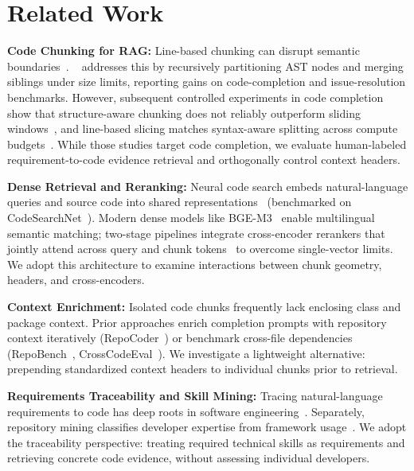 \section{Related Work}
\label{sec:related_work}

\textbf{Code Chunking for RAG:} Line-based chunking can disrupt semantic boundaries~\cite{zhang2025cast}. \castname~\cite{zhang2025cast} addresses this by recursively partitioning AST nodes and merging siblings under size limits, reporting gains on code-completion and issue-resolution benchmarks. However, subsequent controlled experiments in code completion show that structure-aware chunking does not reliably outperform sliding windows~\cite{wu2026chunking}, and line-based slicing matches syntax-aware splitting across compute budgets~\cite{galimzyanov2025practical}. While those studies target code completion, we evaluate human-labeled requirement-to-code evidence retrieval and orthogonally control context headers.

\textbf{Dense Retrieval and Reranking:} Neural code search embeds natural-language queries and source code into shared representations~\cite{feng2020codebert,guo2022unixcoder} (benchmarked on CodeSearchNet~\cite{husain2019codesearchnet}). Modern dense models like BGE-M3~\cite{chen2024bgem3} enable multilingual semantic matching; two-stage pipelines integrate cross-encoder rerankers that jointly attend across query and chunk tokens~\cite{hu2023revisiting,costv2024apsec} to overcome single-vector limits. We adopt this architecture to examine interactions between chunk geometry, headers, and cross-encoders.

\textbf{Context Enrichment:} Isolated code chunks frequently lack enclosing class and package context. Prior approaches enrich completion prompts with repository context iteratively (RepoCoder~\cite{zhang2023repocoder}) or benchmark cross-file dependencies (RepoBench~\cite{liu2024repobench}, CrossCodeEval~\cite{ding2023crosscodeeval}). We investigate a lightweight alternative: prepending standardized context headers to individual chunks prior to retrieval.

\textbf{Requirements Traceability and Skill Mining:} Tracing natural-language requirements to code has deep roots in software engineering~\cite{antoniol2002traceability,gao2024triad}. Separately, repository mining classifies developer expertise from framework usage~\cite{montandon2019identifying}. We adopt the traceability perspective: treating required technical skills as requirements and retrieving concrete code evidence, without assessing individual developers.
